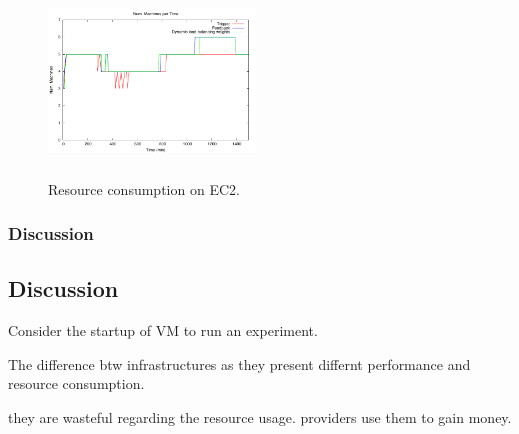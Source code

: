 \begin{figure}
\begin{center}
\includegraphics[width=0.49\textwidth, height=5cm]{./images/heterogeneous/numMachinesCompEC2}
\end{center}
\caption{Resource consumption on EC2.}
\end{figure}


\subsubsection{Discussion}

\subsection{Discussion}

Consider the startup of VM to run an experiment.

The difference btw infrastructures as they present differnt performance and resource consumption.

 they are wasteful regarding the resource usage. providers use them to gain money.


